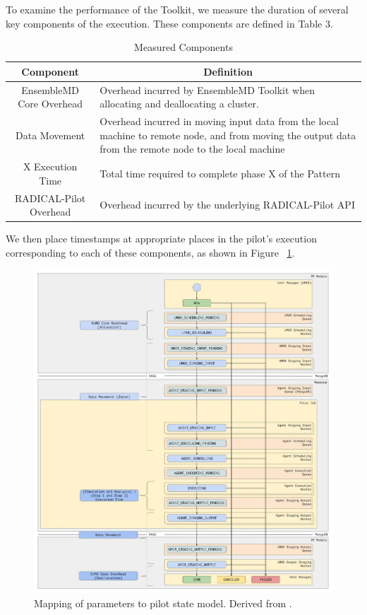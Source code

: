 \documentclass[]{article}
\begin{document}
		To examine the performance of the Toolkit, we measure the duration of several key components of the execution. These components are defined in Table 3.

		\begin{table}[H]
			\centering
			\begin{tabular}{|c|p{10cm}|}
					\hline
					Component & \multicolumn{1}{|c|}{Definition} \\
					\hline
					\hline
					EnsembleMD Core Overhead & Overhead incurred by EnsembleMD Toolkit when allocating and deallocating a cluster. \\
					\hline
					Data Movement &  Overhead incurred in moving input data from the local machine to remote node, and from moving the output data from the remote node to the local machine\\
					\hline
					X Execution Time & Total time required to complete phase X of the Pattern\\
					\hline
					RADICAL-Pilot Overhead & Overhead incurred by the underlying RADICAL-Pilot API \\
					\hline
			\end{tabular}
			\caption{Measured Components}
			\label{table:measured_components}
		\end{table}

		We then place timestamps at appropriate places in the pilot's execution corresponding to each of these components, as shown in Figure ~\ref{fig:param_pilot_state_mapping}.


		\begin{figure}[H]
			\centering
			\includegraphics[scale=.15]{diagrams/enmd_state_model_mapping.jpg}
			\caption{Mapping of parameters to pilot state model. Derived from \cite{rp_state_diagram}.}
			\label{fig:param_pilot_state_mapping}
		\end{figure}
\end{document}
